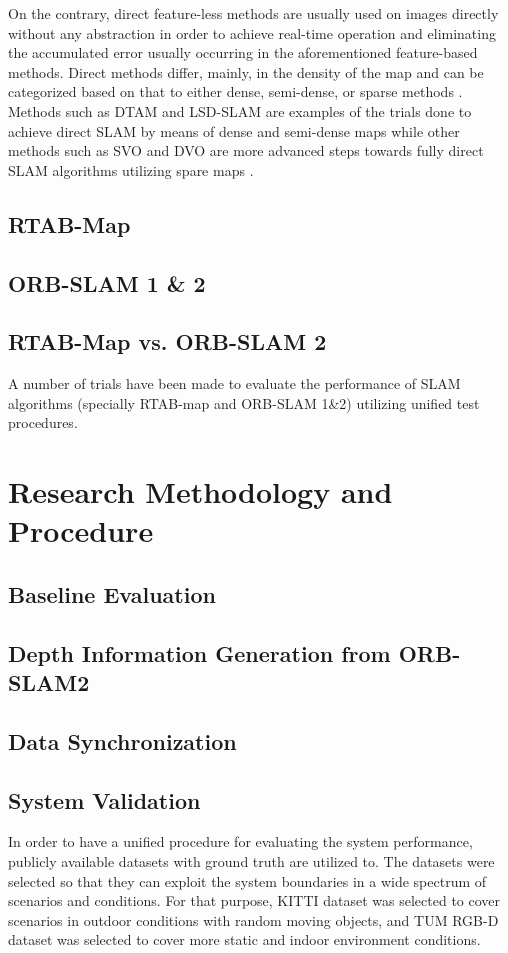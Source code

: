 \documentclass[12pt]{article}
\begin{document}
On the contrary, direct feature-less methods are usually used on images directly without any abstraction \cite{taketomi2017visual} in order to achieve real-time operation and eliminating the accumulated error usually occurring in the aforementioned feature-based methods. Direct methods differ, mainly, in the density of the map and can be categorized based on that to either dense, semi-dense, or sparse methods \cite{taketomi2017visual}. Methods such as DTAM and LSD-SLAM are examples of the trials done to achieve direct SLAM by means of dense and semi-dense maps while other methods such as SVO and DVO are more advanced steps towards fully direct SLAM algorithms utilizing spare maps \cite{cadena2016past}\cite{taketomi2017visual}.

\subsection{RTAB-Map}
\subsection{ORB-SLAM 1 \& 2}
\subsection{RTAB-Map vs. ORB-SLAM 2}
A number of trials have been made to evaluate the performance of SLAM algorithms (specially RTAB-map and ORB-SLAM 1\&2)  utilizing unified test procedures.
\section{Research Methodology and Procedure}
\subsection{Baseline Evaluation}
\subsection{Depth Information Generation from ORB-SLAM2}
\subsection{Data Synchronization}
\subsection{System Validation}
In order to have a unified procedure for evaluating the system performance, publicly available datasets with ground truth are utilized to. The datasets were selected so that they can exploit the system boundaries in a wide spectrum of scenarios and conditions. For that purpose, KITTI dataset \cite{Geiger2012CVPR} was selected to cover scenarios in outdoor conditions with random moving objects, and TUM RGB-D dataset \cite{sturm2012benchmark} was selected to cover more static and indoor environment conditions.
\end{document}
